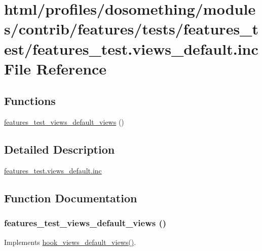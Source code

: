 \hypertarget{features__test_8views__default_8inc}{
\section{html/profiles/dosomething/modules/contrib/features/tests/features\_\-test/features\_\-test.views\_\-default.inc File Reference}
\label{features__test_8views__default_8inc}
}
\subsection*{Functions}
\begin{DoxyCompactItemize}
\item 
\hyperlink{features__test_8views__default_8inc_a9a1166b884823e9172feef236fadf253}{features\_\-test\_\-views\_\-default\_\-views} ()
\end{DoxyCompactItemize}


\subsection{Detailed Description}
\hyperlink{features__test_8views__default_8inc}{features\_\-test.views\_\-default.inc} 

\subsection{Function Documentation}
\hypertarget{features__test_8views__default_8inc_a9a1166b884823e9172feef236fadf253}{
\subsubsection[{features\_\-test\_\-views\_\-default\_\-views}]{\setlength{\rightskip}{0pt plus 5cm}features\_\-test\_\-views\_\-default\_\-views ()}}
\label{features__test_8views__default_8inc_a9a1166b884823e9172feef236fadf253}
Implements \hyperlink{group__views__hooks_ga23edb74860682fa88f75cf94b97c2e15}{hook\_\-views\_\-default\_\-views()}. 